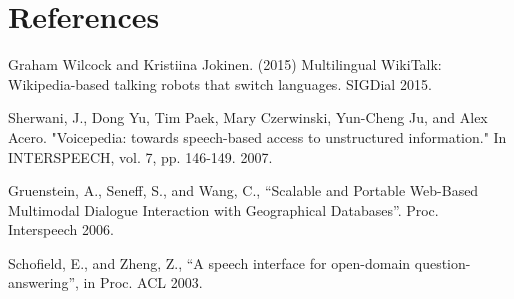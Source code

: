 \documentclass[11pt,a4paper]{article}
\begin{document}
\section{References}
Graham Wilcock and Kristiina Jokinen. (2015) Multilingual WikiTalk: Wikipedia-based talking robots that switch languages. SIGDial 2015.

Sherwani, J., Dong Yu, Tim Paek, Mary Czerwinski, Yun-Cheng Ju, and Alex Acero. "Voicepedia: towards speech-based access to unstructured information." In INTERSPEECH, vol. 7, pp. 146-149. 2007.

Gruenstein, A., Seneff, S., and Wang, C., “Scalable and
Portable Web-Based Multimodal Dialogue Interaction
with Geographical Databases”. Proc. Interspeech 2006.

Schofield, E., and Zheng, Z., “A speech interface for
open-domain question-answering”, in Proc. ACL 2003.
\end{document}
